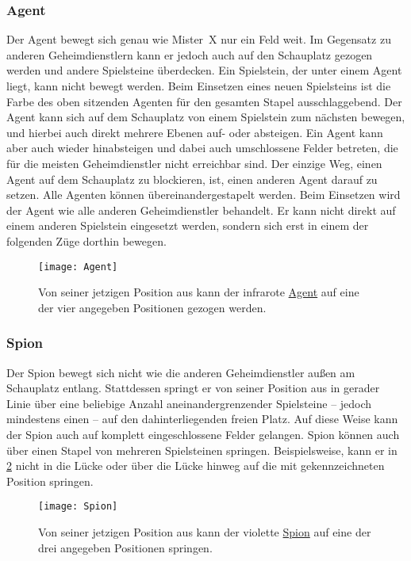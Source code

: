 \documentclass[ngerman, gray]{sdqassignment}
\begin{document}
\subsubsection{Agent}
\label{agent}
Der Agent bewegt sich genau wie Mister~X nur ein Feld weit. Im Gegensatz zu anderen Geheimdienstlern kann er jedoch auch auf den Schauplatz gezogen werden und andere Spielsteine überdecken. Ein Spielstein, der unter einem Agent liegt, kann nicht bewegt werden. Beim Einsetzen eines neuen Spielsteins ist die Farbe des oben sitzenden Agenten für den gesamten Stapel ausschlaggebend. Der Agent kann sich auf dem Schauplatz von einem Spielstein zum nächsten bewegen, und hierbei auch direkt mehrere Ebenen auf- oder absteigen. Ein Agent kann aber auch wieder hinabsteigen und dabei auch umschlossene Felder betreten, die für die meisten Geheimdienstler nicht erreichbar sind. Der einzige Weg, einen Agent auf dem Schauplatz zu blockieren, ist, einen anderen Agent darauf zu setzen. Alle Agenten können übereinandergestapelt werden. Beim Einsetzen wird der Agent wie alle anderen Geheimdienstler behandelt. Er kann nicht direkt auf einem anderen Spielstein eingesetzt werden, sondern sich erst in einem der folgenden Züge dorthin bewegen.

\begin{figure}[ht]
    \centering
    \texttt{[image: Agent]}
    \label{fig:agent}
    \caption{Von seiner jetzigen Position aus kann der infrarote \hyperref[agent]{Agent} auf eine der vier angegeben Positionen gezogen werden.}
\end{figure}

\subsubsection{Spion}
\label{spion}
Der Spion bewegt sich nicht wie die anderen Geheimdienstler außen am Schauplatz entlang. Stattdessen springt er von seiner Position aus in gerader Linie über eine beliebige Anzahl aneinandergrenzender Spielsteine -- jedoch mindestens einen -- auf den dahinterliegenden freien Platz. Auf diese Weise kann der Spion auch auf komplett eingeschlossene Felder gelangen. Spion können auch über einen Stapel von mehreren Spielsteinen springen. Beispielsweise, kann er in \cref{fig:spion} nicht in die Lücke oder über die Lücke hinweg auf die mit  gekennzeichneten Position springen.

\begin{figure}[ht]
    \centering
    \texttt{[image: Spion]}
    \label{fig:spion}
    \caption{Von seiner jetzigen Position aus kann der violette \hyperref[spion]{Spion}  auf eine der drei angegeben Positionen springen.}
\end{figure}
\end{document}
